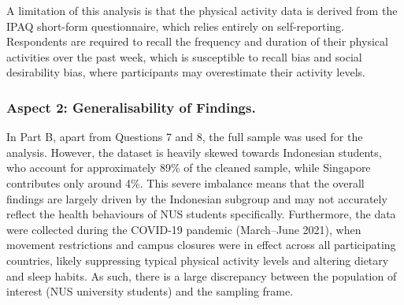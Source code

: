 A limitation of this analysis is that the physical activity data is derived from the IPAQ short-form questionnaire, which relies entirely on self-reporting. Respondents are required to recall the frequency and duration of their physical activities over the past week, which is susceptible to recall bias and social desirability bias, where participants may overestimate their activity levels.

\subsubsection*{Aspect 2: Generalisability of Findings.}
In Part B, apart from Questions 7 and 8, the full sample was used for the analysis. However, the dataset is heavily skewed towards Indonesian students, who account for approximately 89\% of the cleaned sample, while Singapore contributes only around 4\%. This severe imbalance means that the overall findings are largely driven by the Indonesian subgroup and may not accurately reflect the health behaviours of NUS students specifically. Furthermore, the data were collected during the COVID-19 pandemic (March--June 2021), when movement restrictions and campus closures were in effect across all participating countries, likely suppressing typical physical activity levels and altering dietary and sleep habits. As such, there is a large discrepancy between the population of interest (NUS university students) and the sampling frame.